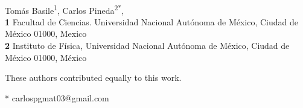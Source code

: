 \documentclass[10pt,letterpaper]{article} %
\begin{document}
\vspace*{0.2in}



\begin{flushleft}
{\Large
\textbf{} %
}
\newline
\\
Tomás Basile\textsuperscript{1\Yinyang},
Carlos Pineda\textsuperscript{2*\Yinyang},
\\
\bigskip
\textbf{1} Facultad de Ciencias. Universidad Nacional Autónoma de México, Ciudad de México 01000, Mexico
\\
\textbf{2} Instituto de Física, Universidad Nacional Autónoma de México, Ciudad de México 01000, México
\\
\bigskip

% 
%
\Yinyang These authors contributed equally to this work.





* carlospgmat03@gmail.com

\end{flushleft}
\end{document}

